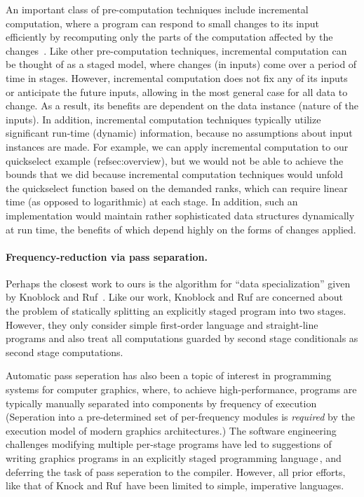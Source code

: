An important class of pre-computation techniques include incremental
computation, where a program can respond to small changes to its input
efficiently by recomputing only the parts of the computation affected
by the
changes~\cite{DemersReTe81,PughTe89,RamalingamRe93,AcarBlBlHaTa09}.
Like other pre-computation techniques, incremental computation can be
thought of as a staged model, where changes (in inputs) come over a
period of time in stages.
%
However, incremental computation does not fix any of its inputs or anticipate the future
inputs, allowing in the most general case for all data to change. As a
result, its benefits are dependent on the data instance (nature of the
inputs). In addition, incremental computation techniques typically
utilize significant run-time (dynamic) information, because no
assumptions about input instances are made.  For example, we can apply
incremental computation to our quickselect example
(ref{sec:overview}), but we would not be able to achieve the bounds
that we did because incremental computation techniques would unfold
the quickselect function based on the demanded ranks, which can
require linear time (as opposed to logarithmic) at each stage.  In
addition, such an implementation would maintain rather sophisticated
data structures dynamically at run time, the benefits of which depend
highly on the forms of changes applied.

\paragraph{Frequency-reduction via pass separation.}
Perhaps the closest work to ours is the algorithm for ``data
specialization'' given by Knoblock and Ruf~\cite{knoblock96}.  Like
our work, Knoblock and Ruf are concerned about the problem of
statically splitting an explicitly staged program into two stages.
However, they only consider simple first-order language and
straight-line programs and also treat all computations guarded by
second stage conditionals as second stage computations.

Automatic pass seperation has also been a topic of interest in
programming systems for computer graphics, where, to achieve
high-performance, programs are typically manually separated into
components by frequency of execution (Seperation into a pre-determined
set of per-frequency modules is \emph{required} by the execution model
of modern graphics architectures.)  The software engineering
challenges modifying multiple per-stage programs have led to
suggestions of writing graphics programs in an explicitly staged
programming language\,\cite{Proudfoot:2001,Foley:2011,He:2014}, and
deferring the task of pass seperation to the compiler. However, all
prior efforts, like that of Knock and Ruf\,\cite{knoblock96} have been
limited to simple, imperative languages.



